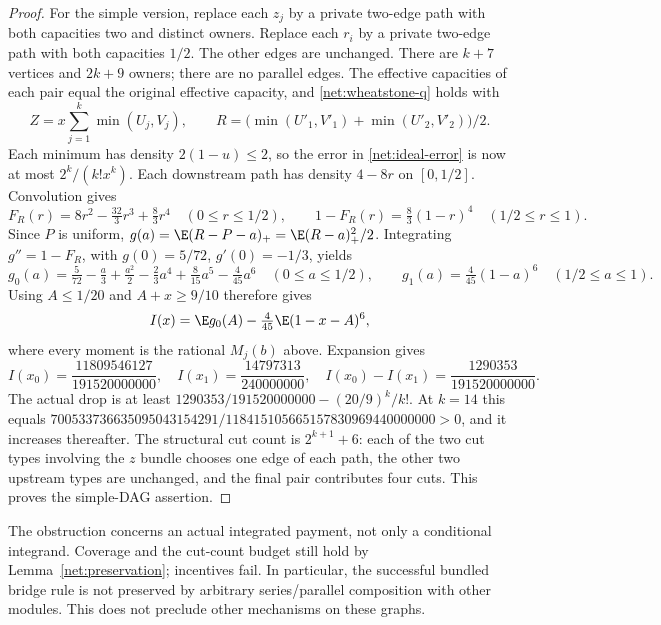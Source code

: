 \begin{proof}
For the simple version, replace each $z_j$ by a private two-edge path with
both capacities two and distinct owners.  Replace each $r_i$ by a private
two-edge path with both capacities $1/2$.  The other edges are unchanged.
There are $k+7$ vertices and $2k+9$ owners; there are no parallel edges.
The effective capacities of each pair equal the original effective capacity,
and \eqref{net:wheatstone-q} holds with
\[
 Z=x\sum_{j=1}^k\min(U_j,V_j),\qquad
 R=\bigl(\min(U'_1,V'_1)+\min(U'_2,V'_2)\bigr)/2.
\]
Each minimum has density $2(1-u)\le2$, so the error in
\eqref{net:ideal-error} is now at most $2^k/(k!x^k)$.
Each downstream path has density $4-8r$ on $[0,1/2]$.
Convolution gives
\[
 F_R(r)=8r^2-\tfrac{32}{3}r^3+\tfrac83r^4\quad(0\le r\le1/2),
 \qquad 1-F_R(r)=\tfrac83(1-r)^4\quad(1/2\le r\le1).
\]
Since $P$ is uniform, $g(a)=\E(R-P-a)_+=\E(R-a)_+^2/2$.
Integrating $g''=1-F_R$, with $g(0)=5/72$, $g'(0)=-1/3$, yields
\[
 g_0(a)=\tfrac5{72}-\tfrac a3+\tfrac{a^2}2-\tfrac23a^4
               +\tfrac8{15}a^5-\tfrac4{45}a^6\quad(0\le a\le1/2),
 \qquad g_1(a)=\tfrac4{45}(1-a)^6\quad(1/2\le a\le1).
\]
Using $A\le1/20$ and $A+x\ge9/10$ therefore gives
\[
 I(x)=\E g_0(A)-\tfrac4{45}\E(1-x-A)^6,
\]
where every moment is the rational $M_j(b)$ above.  Expansion gives
\[
 I(x_0)=\frac{11809546127}{191520000000},\quad
 I(x_1)=\frac{14797313}{240000000},\quad
 I(x_0)-I(x_1)=\frac{1290353}{191520000000}.
\]
The actual drop is at least
$1290353/191520000000-(20/9)^k/k!$.
At $k=14$ this equals
$700533736635095043154291/118415105665157830969440000000>0$,
and it increases thereafter.  The structural cut count is
$2^{k+1}+6$: each of the two cut types involving the $z$ bundle chooses one
edge of each path, the other two upstream types are unchanged, and the
final pair contributes four cuts.  This proves the simple-DAG assertion.
\end{proof}
The obstruction concerns an actual integrated payment, not only a conditional
integrand.  Coverage and the cut-count budget still hold by
Lemma~\ref{net:preservation}; incentives fail.  In particular, the successful
bundled bridge rule is not preserved by arbitrary series/parallel composition
with other modules.  This does not preclude other mechanisms on these graphs.


